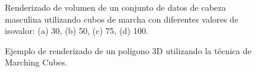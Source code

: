 \begin{figure}[!ht]
	\begin{center}
	\end{center}\vspace*{-0.6cm}
	\caption[Ilustración de Marching Cubes]{Renderizado de volumen de un conjunto de datos de cabeza masculina utilizando cubos de marcha con diferentes valores de isovalor: (a) 30, (b) 50, (c) 75, (d) 100.}
	\label{fig-marching-cubes1}
	\end{figure}


\begin{figure}[!ht]
	\begin{center}
	\end{center}\vspace*{-0.6cm}
	\caption[Ilustración de Marching Cubes]{Ejemplo de renderizado de un polígono 3D utilizando la técnica de Marching Cubes.}
	\label{fig-marching-cubes1}
	\end{figure}

